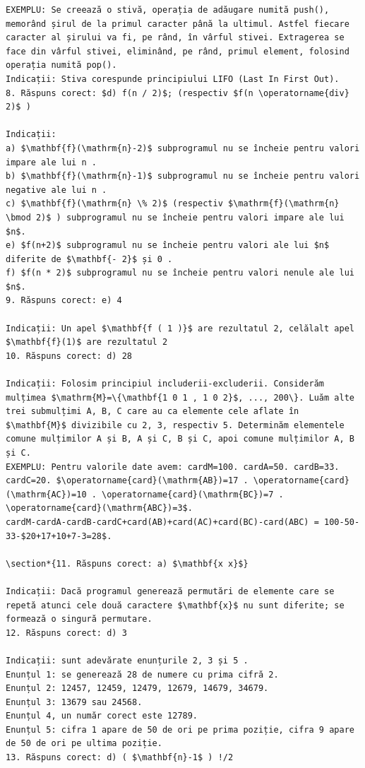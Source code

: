 \documentclass[10pt]{article}
\begin{document}
\begin{verbatim}
EXEMPLU: Se creează o stivă, operația de adăugare numită push(), memorând șirul de la primul caracter până la ultimul. Astfel fiecare caracter al șirului va fi, pe rând, în vârful stivei. Extragerea se face din vârful stivei, eliminând, pe rând, primul element, folosind operația numită pop().
Indicații: Stiva corespunde principiului LIFO (Last In First Out).
8. Răspuns corect: $d) f(n / 2)$; (respectiv $f(n \operatorname{div} 2)$ )

Indicații:
a) $\mathbf{f}(\mathrm{n}-2)$ subprogramul nu se încheie pentru valori impare ale lui n .
b) $\mathbf{f}(\mathrm{n}-1)$ subprogramul nu se încheie pentru valori negative ale lui n .
c) $\mathbf{f}(\mathrm{n} \% 2)$ (respectiv $\mathrm{f}(\mathrm{n} \bmod 2)$ ) subprogramul nu se încheie pentru valori impare ale lui $n$.
e) $f(n+2)$ subprogramul nu se încheie pentru valori ale lui $n$ diferite de $\mathbf{- 2}$ și 0 .
f) $f(n * 2)$ subprogramul nu se încheie pentru valori nenule ale lui $n$.
9. Răspuns corect: e) 4

Indicații: Un apel $\mathbf{f ( 1 )}$ are rezultatul 2, celălalt apel $\mathbf{f}(1)$ are rezultatul 2
10. Răspuns corect: d) 28

Indicații: Folosim principiul includerii-excluderii. Considerăm mulțimea $\mathrm{M}=\{\mathbf{1 0 1 , 1 0 2}$, ..., 200\}. Luăm alte trei submulțimi A, B, C care au ca elemente cele aflate în $\mathbf{M}$ divizibile cu 2, 3, respectiv 5. Determinăm elementele comune mulțimilor A și B, A și C, B și C, apoi comune mulțimilor A, B și C.
EXEMPLU: Pentru valorile date avem: cardM=100. cardA=50. cardB=33. cardC=20. $\operatorname{card}(\mathrm{AB})=17 . \operatorname{card}(\mathrm{AC})=10 . \operatorname{card}(\mathrm{BC})=7 . \operatorname{card}(\mathrm{ABC})=3$.
cardM-cardA-cardB-cardC+card(AB)+card(AC)+card(BC)-card(ABC) = 100-50-33-$20+17+10+7-3=28$.

\section*{11. Răspuns corect: a) $\mathbf{x x}$}

Indicații: Dacă programul generează permutări de elemente care se repetă atunci cele două caractere $\mathbf{x}$ nu sunt diferite; se formează o singură permutare.
12. Răspuns corect: d) 3

Indicații: sunt adevărate enunțurile 2, 3 și 5 .
Enunțul 1: se generează 28 de numere cu prima cifră 2.
Enunțul 2: 12457, 12459, 12479, 12679, 14679, 34679.
Enunțul 3: 13679 sau 24568.
Enunțul 4, un număr corect este 12789.
Enunțul 5: cifra 1 apare de 50 de ori pe prima poziție, cifra 9 apare de 50 de ori pe ultima poziție.
13. Răspuns corect: d) ( $\mathbf{n}-1$ ) !/2


\end{verbatim}
\end{document}
